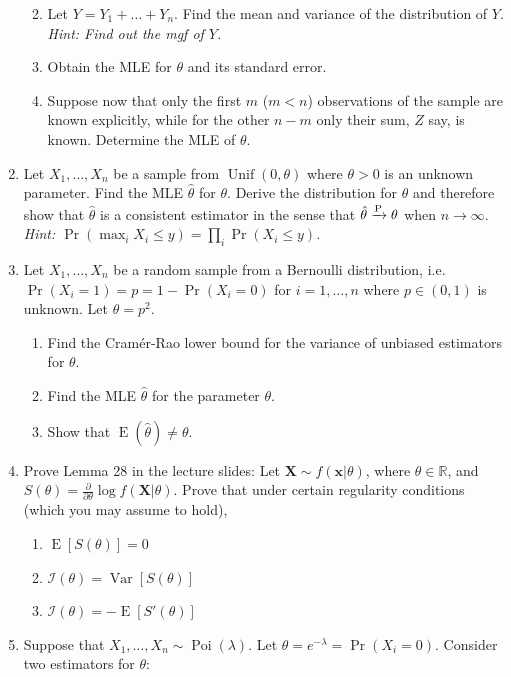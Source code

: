 \documentclass[
]{book}
\newcommand{\bx}{{\boldsymbol x}}
\newcommand{\bX}{{\boldsymbol X}}
\DeclareMathOperator{\E}{E}
\DeclareMathOperator{\Var}{Var}
\DeclareMathOperator{\Pois}{Poi}
\DeclareMathOperator{\Unif}{Unif}
\newcommand{\bbR}{\mathbb{R}}
\newcommand{\cI}{{\mathcal I}}
\theoremstyle{definition}
\theoremstyle{definition}
\theoremstyle{definition}
\theoremstyle{definition}
\theoremstyle{remark}
\begin{document}
\begin{enumerate}
  \begin{enumerate}
  \def\labelenumii{(\alph{enumii})}
  \item
    Let \(Y=Y_1+\dots+Y_n\). Find the mean and variance of the distribution of \(Y\). \emph{Hint: Find out the mgf of \(Y\).}
  \item
    Obtain the MLE for \(\theta\) and its standard error.
  \item
    Suppose now that only the first \(m\) (\(m<n\)) observations of the sample are known explicitly, while for the other \(n-m\) only their sum, \(Z\) say, is known. Determine the MLE of \(\theta\).
  \end{enumerate}
\item
  Let \(X_1,\dots,X_n\) be a sample from \(\Unif(0,\theta)\) where \(\theta>0\) is an unknown parameter. Find the MLE \(\hat\theta\) for \(\theta\). Derive the distribution for \(\hat\theta\) and therefore show that \(\hat\theta\) is a consistent estimator in the sense that \(\hat\theta \xrightarrow{\text P}\theta\) when \(n\to\infty\). \emph{Hint: \(\Pr(\max_i X_i \leq y)=\prod_{i} \Pr(X_i\leq y)\).}
\item
  Let \(X_1,\dots,X_n\) be a random sample from a Bernoulli distribution, i.e.~\(\Pr(X_i=1)=p=1-\Pr(X_i=0)\) for \(i=1,\dots,n\) where \(p\in(0,1)\) is unknown. Let \(\theta=p^2.\)

  \begin{enumerate}
  \def\labelenumii{(\alph{enumii})}
  \item
    Find the Cramér-Rao lower bound for the variance of unbiased estimators for \(\theta\).
  \item
    Find the MLE \(\hat\theta\) for the parameter \(\theta\).
  \item
    Show that \(\E(\hat\theta) \neq \theta\).
  \end{enumerate}
\item
  Prove Lemma 28 in the lecture slides: Let \(\bX\sim f(\bx|\theta)\), where \(\theta\in\bbR\), and \(S(\theta)=\frac{\partial}{\partial \theta} \log f(\bX|\theta)\). Prove that under certain regularity conditions (which you may assume to hold),

  \begin{enumerate}
  \def\labelenumii{(\alph{enumii})}
  \item
    \(\E [S(\theta)] = 0\)
  \item
    \(\cI(\theta) = \Var[S(\theta)]\)
  \item
    \(\cI(\theta) = -\E[S'(\theta)]\)
  \end{enumerate}
\item
  Suppose that \(X_1,\dots,X_n\sim\Pois(\lambda)\). Let \(\theta=e^{-\lambda}=\Pr(X_i=0)\). Consider two estimators for \(\theta\):


\end{enumerate}
\end{document}
